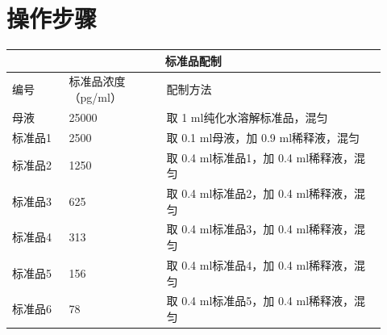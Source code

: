 \documentclass[UTF8,10pt,a4paper,fontset=fandol]{ctexart}
\newcommand{\fieldvalue}[1]{#1}
\newcommand{\handwritten}[1]{#1}
\begin{document}
\section{操作步骤}

\begin{tabular}{|p{0.14\linewidth}|p{0.24\linewidth}|p{0.54\linewidth}|}
\hline
\multicolumn{3}{|c|}{标准品配制} \\
\hline
编号 & 标准品浓度（pg/ml） & 配制方法 \\
\hline
母液 & 25000 &
取
\fieldvalue{\handwritten{1}}
ml纯化水溶解标准品，混匀 \\
\hline
标准品1 & 2500 &
取
\fieldvalue{\handwritten{0.1}}
ml母液，加
\fieldvalue{\handwritten{0.9}}
ml稀释液，混匀 \\
\hline
标准品2 & 1250 &
取
\fieldvalue{\handwritten{0.4}}
ml标准品1，加
\fieldvalue{\handwritten{0.4}}
ml稀释液，混匀 \\
\hline
标准品3 & 625 &
取
\fieldvalue{\handwritten{0.4}}
ml标准品2，加
\fieldvalue{\handwritten{0.4}}
ml稀释液，混匀 \\
\hline
标准品4 & 313 &
取
\fieldvalue{\handwritten{0.4}}
ml标准品3，加
\fieldvalue{\handwritten{0.4}}
ml稀释液，混匀 \\
\hline
标准品5 & 156 &
取
\fieldvalue{\handwritten{0.4}}
ml标准品4，加
\fieldvalue{\handwritten{0.4}}
ml稀释液，混匀 \\
\hline
标准品6 & 78 &
取
\fieldvalue{\handwritten{0.4}}
ml标准品5，加
\fieldvalue{\handwritten{0.4}}
ml稀释液，混匀 \\

\end{tabular}
\end{document}
